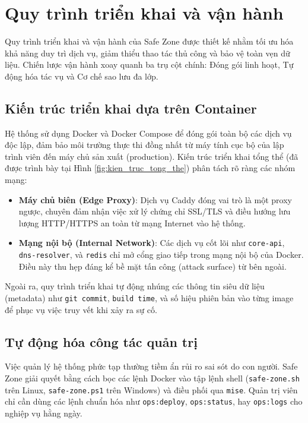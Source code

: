 \section{Quy trình triển khai và vận hành}

Quy trình triển khai và vận hành của Safe Zone được thiết kế nhằm tối ưu hóa khả năng duy trì dịch vụ, giảm thiểu thao tác thủ công và bảo vệ toàn vẹn dữ liệu. Chiến lược vận hành xoay quanh ba trụ cột chính: Đóng gói linh hoạt, Tự động hóa tác vụ và Cơ chế sao lưu đa lớp.

\subsection{Kiến trúc triển khai dựa trên Container}
Hệ thống sử dụng Docker và Docker Compose để đóng gói toàn bộ các dịch vụ độc lập, đảm bảo môi trường thực thi đồng nhất từ máy tính cục bộ của lập trình viên đến máy chủ sản xuất (production). Kiến trúc triển khai tổng thể (đã được trình bày tại Hình \ref{fig:kien_truc_tong_the}) phân tách rõ ràng các nhóm mạng:
\begin{itemize}
    \item \textbf{Máy chủ biên (Edge Proxy)}: Dịch vụ Caddy đóng vai trò là một proxy ngược, chuyên đảm nhận việc xử lý chứng chỉ SSL/TLS và điều hướng lưu lượng HTTP/HTTPS an toàn từ mạng Internet vào hệ thống.
    \item \textbf{Mạng nội bộ (Internal Network)}: Các dịch vụ cốt lõi như \texttt{core-api}, \texttt{dns-resolver}, và \texttt{redis} chỉ mở cổng giao tiếp trong mạng nội bộ của Docker. Điều này thu hẹp đáng kể bề mặt tấn công (attack surface) từ bên ngoài.
\end{itemize}
Ngoài ra, quy trình triển khai tự động nhúng các thông tin siêu dữ liệu (metadata) như \texttt{git commit}, \texttt{build time}, và số hiệu phiên bản vào từng image để phục vụ việc truy vết khi xảy ra sự cố.

\subsection{Tự động hóa công tác quản trị}
Việc quản lý hệ thống phức tạp thường tiềm ẩn rủi ro sai sót do con người. Safe Zone giải quyết bằng cách bọc các lệnh Docker vào tập lệnh shell (\texttt{safe-zone.sh} trên Linux, \texttt{safe-zone.ps1} trên Windows) và điều phối qua \texttt{mise}. Quản trị viên chỉ cần dùng các lệnh chuẩn hóa như \texttt{ops:deploy}, \texttt{ops:status}, hay \texttt{ops:logs} cho nghiệp vụ hằng ngày.

